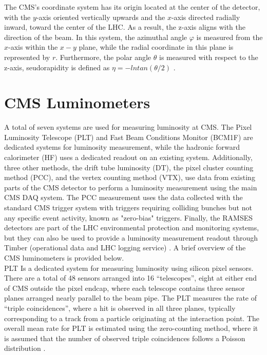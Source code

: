 The CMS's coordinate system has its origin located at the center of the detector, with the $y$-axis oriented vertically upwards and the $x$-axis directed radially inward, toward the center of the LHC. As a result, the z-axis aligns with the direction of the beam. In this system, the azimuthal angle $\varphi$ is measured from the $x$-axis within the $x-y$ plane, while the radial coordinate in this plane is represented by $r$. Furthermore, the polar angle $\theta$ is measured with respect to the z-axis, seudorapidity is defined as $\eta = − ln tan(\theta/2)$ \cite{CMS_Exp_2008}.

\section{CMS Luminometers}

A total of seven systems are used for measuring luminosity at CMS. The Pixel Luminosity Telescope (PLT) and Fast Beam Conditions Monitor (BCM1F) are dedicated systems for luminosity measurement, while the hadronic forward calorimeter (HF) uses a dedicated readout on an existing system. Additionally, three other methods, the drift tube luminosity (DT), the pixel cluster counting method (PCC), and the vertex counting method (VTX), use data from existing parts of the CMS detector to perform a luminosity measurement using the main CMS DAQ system. The PCC measurement uses the data collected with the standard CMS trigger system with triggers requiring colliding bunches but not any specific event activity, known as "zero-bias" triggers. Finally, the RAMSES detectors are part of the LHC environmental protection and monitoring systems, but they can also be used to provide a luminosity measurement readout through Timber (operational data and LHC logging service) \cite{pas_18}.  A brief overview of the CMS luminometers is provided below.\\

PLT Is a dedicated system for measuring luminosity using silicon pixel sensors. There are a total of 48 sensors arranged into 16 “telescopes”, eight at either end of CMS outside the pixel endcap, where each telescope contains three sensor planes arranged nearly parallel to the beam pipe. The PLT measures the rate of “triple coincidences”, where a hit is observed in all three planes, typically corresponding to a track from a particle originating at the interaction point. The overall mean rate for PLT  is estimated using the zero-counting method, where it is assumed that the number of observed triple coincidences follows a Poisson distribution \cite{pas_18}. \\

